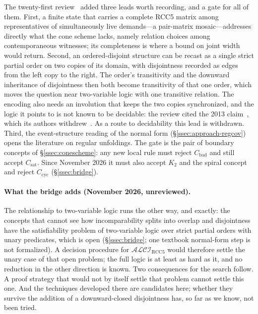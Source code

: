 \documentclass[11pt]{article}
\newcommand{\ALCIRCC}[1]{\mathcal{ALCI}_{\mathrm{RCC#1}}}
\theoremstyle{plain}
\theoremstyle{definition}
\begin{document}
The twenty-first review~\cite{GPT56SolReview} added three leads worth
recording, and a gate for all of them. First, a finite state that carries a
complete RCC5 matrix among representatives of simultaneously live demands---a
pair-matrix mosaic---addresses directly what the cone scheme lacks, namely
relation choices among contemporaneous witnesses; its completeness is where a
bound on joint width would return. Second, an ordered-disjoint structure can
be recast as a single strict partial order on two copies of its domain, with
disjointness recorded as edges from the left copy to the right. The order's
transitivity and the downward inheritance of disjointness then both become
transitivity of that one order, which moves the question near two-variable
logic with one transitive relation. The encoding also needs an involution that
keeps the two copies synchronized, and the logic it points to is not known to
be decidable: the review cited the 2013 claim~\cite{SzwastTendera2013}, which
its authors withdrew~\cite{SzwastTendera2018}. As a route to decidability this
lead is withdrawn. Third, the event-structure reading of the normal form
(\S\ref{ssec:approach-regcov}) opens the literature on regular unfoldings. The
gate is the pair of boundary concepts of \S\ref{ssec:conescheme}: any new local
rule must reject $C_{\mathrm{bad}}$ and still accept $C_{\mathrm{sat}}$. Since
November 2026 it must also accept $K_2$ and the spiral concept and reject
$C_{\mathrm{cyc}}$ (\S\ref{ssec:bridge}).

\paragraph{What the bridge adds (November 2026, unreviewed).} The relationship
to two-variable logic runs the other way, and exactly: the concepts that
cannot see how incomparability splits into overlap and disjointness have the
satisfiability problem of two-variable logic over strict partial orders with
unary predicates, which is open (\S\ref{ssec:bridge}; one textbook
normal-form step is not formalized). A decision procedure for $\ALCIRCC5$
would therefore settle the unary case of that open problem; the full logic is
at least as hard as it, and no reduction in the other direction is known. Two
consequences for the search follow. A proof strategy
that would not by itself settle that problem cannot settle this one. And the
techniques developed there are candidates here; whether they survive the
addition of a downward-closed disjointness has, so far as we know, not been
tried.
\end{document}

